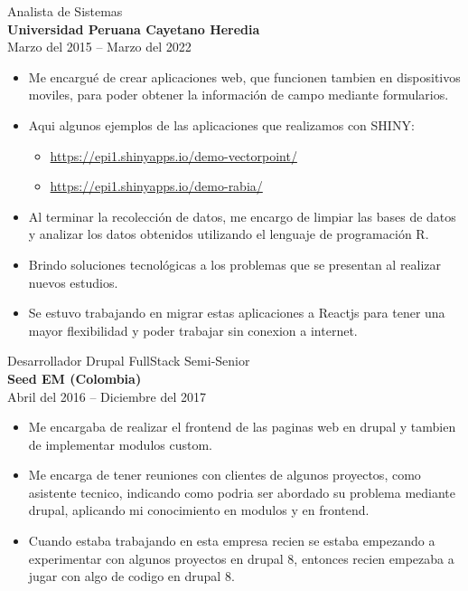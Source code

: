 \documentclass[letterpaper]{twentysecondcv} %
\begin{document}
{\Large Analista de Sistemas}\\
{\large \bf Universidad Peruana Cayetano Heredia}\\
{Marzo del 2015 -- Marzo del 2022}
\begin{itemize}
\item Me encargué de crear aplicaciones web, que funcionen tambien en dispositivos moviles, para poder obtener la información de campo mediante formularios.

\item Aqui algunos ejemplos de las aplicaciones que realizamos con SHINY:
  \begin{itemize}
	\item {\url{https://epi1.shinyapps.io/demo-vectorpoint/}}
	\item {\url{https://epi1.shinyapps.io/demo-rabia/}}\\
  \end{itemize}
\item Al terminar la recolección de datos, me encargo de limpiar las bases de datos y analizar los datos obtenidos utilizando el lenguaje de programación R.
\item Brindo soluciones tecnológicas a los problemas que se presentan al realizar nuevos estudios.
\item Se estuvo trabajando en migrar estas aplicaciones a Reactjs para tener una mayor flexibilidad y poder trabajar sin conexion a internet.\\
\end{itemize}

{\Large Desarrollador Drupal FullStack Semi-Senior}\\
{\large \bf Seed EM (Colombia)}\\
{Abril del 2016 -- Diciembre del 2017}
\begin{itemize}
\item Me encargaba de realizar el frontend de las paginas web en drupal y tambien de implementar modulos custom. 
\item Me encarga de tener reuniones con clientes de algunos proyectos, como asistente tecnico, indicando como podria ser abordado su problema mediante drupal, aplicando mi conocimiento en modulos y en frontend.
\item Cuando estaba trabajando en esta empresa recien se estaba empezando a experimentar con algunos proyectos en drupal 8, entonces recien empezaba a jugar con algo de codigo en drupal 8.\\

\end{itemize}
\end{document}
